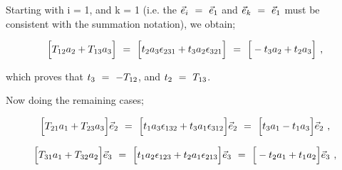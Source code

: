 \documentclass{article}
\begin{document}
Starting with  i = 1, and k = 1 (i.e. the \begin{math} \vec{e}_i \hspace{0.125cm} = \hspace{0.125cm} \vec{e}_1 \end{math} and \begin{math} \vec{e}_k \hspace{0.125cm} = \hspace{0.125cm} \vec{e}_1 \end{math} must be consistent with the summation notation), we obtain;

\begin{equation} \label{eb-eq-1-45}
\Big[ T_{1 2} a_2 + T_{1 3} a_3 \Big] \hspace{0.125cm} = \hspace{0.125cm} \Big[ t_2 a_3 \epsilon_{2 3 1} + t_3 a_2 \epsilon_{3 2 1} \Big]\hspace{0.125cm} = \hspace{0.125cm} \Big[- t_3 a_2 + t_2 a_3 \Big] \hspace{0.125cm} , 
\end{equation}

which proves that \begin{math}  t_3 \hspace{0.125cm} = \hspace{0.125cm} - T_{1 2} \end{math}, and \begin{math} t_2 \hspace{0.125cm} = \hspace{0.125cm} T_{1 3} \end{math}.

Now doing the remaining cases; 

\begin{equation} \label{eb-eq-1-46}
\Big[ T_{2 1} a_1 + T_{2 3} a_3 \Big] \vec{e}_2 \hspace{0.125cm} = \hspace{0.125cm} \Big[ t_1 a_3 \epsilon_{1 3 2} + t_3 a_1 \epsilon_{3 1 2} \Big] \vec{e}_2 \hspace{0.125cm} = \hspace{0.125cm} \Big[ t_3 a_1 - t_1 a_3 \Big] \vec{e}_2 \hspace{0.125cm} , 
\end{equation}

\begin{equation} \label{eb-eq-1-47}
\Big[ T_{3 1} a_1 + T_{3 2} a_2 \Big] \vec{e}_3 \hspace{0.125cm} = \hspace{0.125cm} \Big[ t_1 a_2 \epsilon_{1 2 3} + t_2 a_1 \epsilon_{2 1 3} \Big] \vec{e}_3 \hspace{0.125cm} = \hspace{0.125cm} \Big[ - t_2 a_1 + t_1 a_2  \Big] \vec{e}_3 \hspace{0.125cm} , 
\end{equation}
\end{document}
